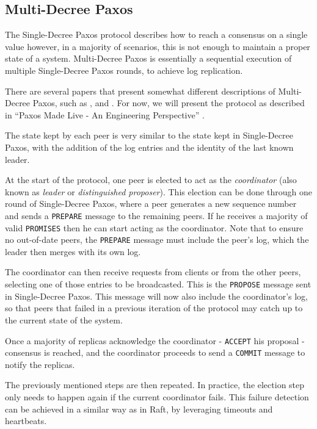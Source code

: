 \subsection{Multi-Decree Paxos}

The Single-Decree Paxos protocol describes how to reach a consensus on a single value however, in a majority of scenarios, this is not enough to maintain a proper state of a system. Multi-Decree Paxos is essentially a sequential execution of multiple Single-Decree Paxos rounds, to achieve log replication. 

There are several papers that present somewhat different descriptions of Multi-Decree Paxos, such as \cite{paxos_complex}, \cite{paxos_live} and \cite{paxos_vs_raft}. For now, we will present the protocol as described in “Paxos Made Live - An Engineering Perspective” \cite{paxos_live}.

The state kept by each peer is very similar to the state kept in Single-Decree Paxos, with the addition of the log entries and the identity of the last known leader.

At the start of the protocol, one peer is elected to act as the \textit{coordinator} (also known as \textit{leader} or \textit{distinguished proposer}). This election can be done through one round of Single-Decree Paxos, where a peer generates a new sequence number and sends a \texttt{PREPARE} message to the remaining peers. If he receives a majority of valid \texttt{PROMISES} then he can start acting as the coordinator. Note that to ensure no out-of-date peers, the \texttt{PREPARE} message must include the peer’s log, which the leader then merges with its own log.

The coordinator can then receive requests from clients or from the other peers, selecting one of those entries to be broadcasted. This is the \texttt{PROPOSE} message sent in Single-Decree Paxos. This message will now also include the coordinator’s log, so that peers that failed in a previous iteration of the protocol may catch up to the current state of the system.

Once a majority of replicas acknowledge the coordinator - \texttt{ACCEPT} his proposal - consensus is reached, and the coordinator proceeds to send a \texttt{COMMIT} message to notify the replicas.

\vspace{0.5cm}

The previously mentioned steps are then repeated. In practice, the election step only needs to happen again if the current coordinator fails. This failure detection can be achieved in a similar way as in Raft, by leveraging timeouts and heartbeats.

